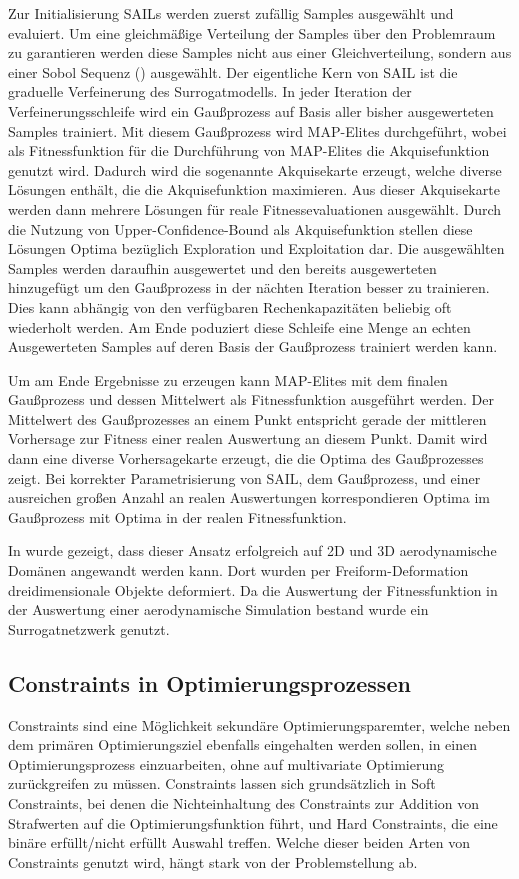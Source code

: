 Zur Initialisierung SAILs werden zuerst zufällig Samples ausgewählt und evaluiert.
Um eine gleichmäßige Verteilung der Samples über den Problemraum zu garantieren werden diese Samples nicht aus einer Gleichverteilung, sondern aus einer Sobol Sequenz (\cite{Sobol.1967}) ausgewählt.
Der eigentliche Kern von SAIL ist die graduelle Verfeinerung des Surrogatmodells.
In jeder Iteration der Verfeinerungsschleife wird ein Gaußprozess auf Basis aller bisher ausgewerteten Samples trainiert.
Mit diesem Gaußprozess wird MAP-Elites durchgeführt, wobei als Fitnessfunktion für die Durchführung von MAP-Elites die Akquisefunktion genutzt wird.
Dadurch wird die sogenannte Akquisekarte erzeugt, welche diverse Lösungen enthält, die die Akquisefunktion maximieren.
Aus dieser Akquisekarte werden dann mehrere Lösungen für reale Fitnessevaluationen ausgewählt.
Durch die Nutzung von Upper-Confidence-Bound als Akquisefunktion stellen diese Lösungen Optima bezüglich Exploration und Exploitation dar.
Die ausgewählten Samples werden daraufhin ausgewertet  und den bereits ausgewerteten hinzugefügt um den Gaußprozess in der nächten Iteration besser zu trainieren.
Dies kann abhängig von den verfügbaren Rechenkapazitäten beliebig oft wiederholt werden.
Am Ende poduziert diese Schleife eine Menge an echten Ausgewerteten Samples auf deren Basis der Gaußprozess trainiert werden kann.

Um am Ende Ergebnisse zu erzeugen kann MAP-Elites mit dem finalen Gaußprozess und dessen Mittelwert als Fitnessfunktion ausgeführt werden.
Der Mittelwert des Gaußprozesses an einem Punkt entspricht gerade der mittleren Vorhersage zur Fitness einer realen Auswertung an diesem Punkt.
Damit wird dann eine diverse Vorhersagekarte erzeugt, die die Optima des Gaußprozesses zeigt.
Bei korrekter Parametrisierung von SAIL, dem Gaußprozess, und einer ausreichen großen Anzahl an realen Auswertungen korrespondieren Optima im Gaußprozess mit Optima in der realen Fitnessfunktion.

In \cite{Gaier.6152018} wurde gezeigt, dass dieser Ansatz erfolgreich auf 2D und 3D aerodynamische Domänen angewandt werden kann.
Dort wurden per Freiform-Deformation dreidimensionale Objekte deformiert.
Da die Auswertung der Fitnessfunktion in der Auswertung einer aerodynamische Simulation bestand wurde ein Surrogatnetzwerk genutzt.


\subsection{Constraints in Optimierungsprozessen}
Constraints sind eine Möglichkeit sekundäre Optimierungsparemter, welche neben dem primären Optimierungsziel ebenfalls eingehalten werden sollen, in einen Optimierungsprozess einzuarbeiten, ohne auf multivariate Optimierung zurückgreifen zu müssen.
Constraints lassen sich grundsätzlich in Soft Constraints, bei denen die Nichteinhaltung des Constraints zur Addition von Strafwerten auf die Optimierungsfunktion führt, und Hard Constraints, die eine binäre erfüllt/nicht erfüllt Auswahl treffen.
Welche dieser beiden Arten von Constraints genutzt wird, hängt stark von der Problemstellung ab.

